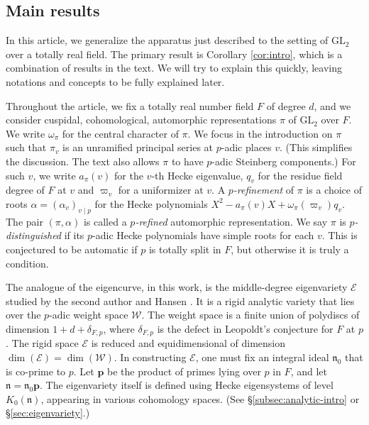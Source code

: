 \documentclass[10pt, twoside]{amsart}
\theoremstyle{plain}
\theoremstyle{definition}
\theoremstyle{remark}
\numberwithin{equation}{subsection}
\def\p{\mathbf{p}}
\def\GL{\mathrm{GL}}
\def\gn{\mathfrak n}
\def\scre{\mathscr E}
\def\scrw{\mathscr W}
\begin{document}
\subsection{Main results}\label{subsec:main-result}
In this article, we generalize the apparatus just described to the setting of $\GL_2$ over a totally real field. The primary result is Corollary \ref{cor:intro}, which is a combination of results in the text. We will try to explain this quickly, leaving notations and concepts to be fully explained later.

Throughout the article, we fix a totally real number field $F$ of degree $d$, and we consider cuspidal, cohomological, automorphic representations $\pi$ of $\GL_2$ over $F$. We write $\omega_{\pi}$ for the central character of $\pi$. We focus in the introduction on $\pi$ such that $\pi_v$ is an unramified principal series at $p$-adic places $v$. (This simplifies the discussion. The text also allows $\pi$ to have $p$-adic Steinberg components.) For such $v$, we write $a_{\pi}(v)$ for the $v$-th Hecke eigenvalue, {$q_v$ for the residue field degree of $F$ at $v$ and $\varpi_v$ for a uniformizer at $v$.} A \emph{$p$-refinement} of $\pi$ is a choice of roots $\alpha = (\alpha_v)_{v \mid p}$ for the Hecke polynomials $X^2 - a_\pi(v)X + \omega_{\pi}(\varpi_v)q_v$. The pair $(\pi,\alpha)$ is called a \emph{$p$-refined} automorphic representation. We say $\pi$ is {\em $p$-distinguished} if its $p$-adic Hecke polynomials have simple roots for each $v$. This is conjectured to be automatic if $p$ is totally split in $F$, but otherwise it is truly a condition.

The analogue of the eigencurve, in this work, is the middle-degree eigenvariety $\scre$ studied by the second author and Hansen \cite{BH}. It is a rigid analytic variety that lies over the $p$-adic weight space $\scrw$. The weight space is a finite union of polydiscs of dimension $1+d+\delta_{F,p}$, where $\delta_{F,p}$ is the defect in Leopoldt's conjecture for $F$ at $p$. The rigid space $\scre$ is reduced and equidimensional of dimension $\dim(\scre) = \dim(\scrw)$. In constructing $\scre$, one must fix an integral ideal $\gn_0$ that is co-prime to $p$.  Let $\p$ be the product of primes lying over $p$ in $F$, and let $\gn = \gn_0 \p$.  The eigenvariety itself is defined using Hecke eigensystems of level $K_0(\gn)$, appearing in various cohomology spaces. (See \S \ref{subsec:analytic-intro} or \S \ref{sec:eigenvariety}.)
\end{document}
